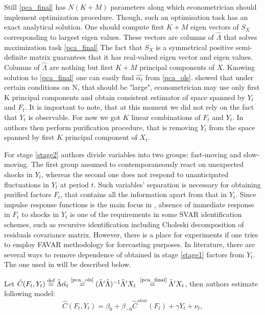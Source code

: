 \documentclass[a4paper, 14pt]{article}
\begin{document}
 Still \eqref{pca_final} has $N(K+M)$ parameters along which econometrician should implement optimization procedure. Though, such an optimisation task has an exact analytical solution. One should compute first $K+M$ eigen vectors of $S_X$ corresponding to largest eigen values. These vectors are columns of $\hat{\Lambda}$ that solves maximization task \eqref{pca_final} The fact that $S_X$ is a symmetrical positive semi-definite matrix guarantees that it has real-valued eigen vector and eigen values. Columns of $\hat{\Lambda}$ are nothing but first $K+M$ principal components of $X$. Knowing solution to \eqref{pca_final} one can easily find $\hat{\alpha_t}$ from \eqref{pca_ols}. \cite{stock2002macroeconomic} showed that under certain conditions on N, that should be "large", econometrician may use only first K principal components and obtain consistent estimator of space spanned by $Y_t$ and $F_t$. It is important to note, that at this moment we did not rely on the fact that $Y_t$ is observable. For now we got $K$ linear combinations of $F_t$ and $Y_t$. In \cite{bernanke2005measuring} authors then perform purification procedure, that is removing $Y_t$ from the space spanned by first $K$ principal component of $X_t$.
 
 For stage \ref{stage2} authors divide variables into two groups: fast-moving and slow-moving. The first group assumed to contemporaneously react on unexpected shocks in $Y_t$, whereas the second one does not respond to unanticipated fluctuations in $Y_t$ at period $t$. Such variables' separation is necessary for obtaining purified factors $F_t$, that contains all the information apart from that in $Y_t$. Since impulse response functions is the main focus in \cite{bernanke2005measuring}, absence of immediate response in $F_t$ to shocks in $Y_t$ is one of the requirements in some SVAR identification schemes, such as recursive identification including Choleski decomposition of residuals covariance matrix. However, there is a place for experiments if one tries to employ FAVAR methodology for forecasting purposes. In literature, there are several ways to remove dependence of obtained in stage \ref{stage1} factors from $Y_t$. The one used in \cite{bernanke2005measuring} will be described below.
 
 \noindent Let $\hat{C}(F_t, Y_t) \stackrel{\text{def}}{=} \hat{\Lambda} \hat{\alpha_t} \stackrel{\text{\eqref{pca_ols}}}{=} (\hat\Lambda' \hat\Lambda)^{-1}\hat\Lambda'X_t  \stackrel{\text{ \eqref{pca_final}}}{=} \hat\Lambda'X_t$, then authors estimate following model:
 \begin{equation}\label{favar_pure}
 \hat{C}(F_t, Y_t) = \beta_0 + \beta_{-0} \hat{C}^{slow}(F_t) + \gamma Y_t + \nu_t ,
 \end{equation}
 
\end{document}
